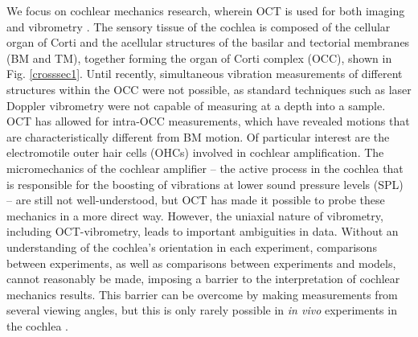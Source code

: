 \documentclass[preprint,NumberedRefs]{JASA}
\begin{document}
\par{We focus on cochlear mechanics research, wherein OCT is used for both imaging and vibrometry \citep{gao,dongoghalai,fallah,strimbu2020,fangyi,lee,cooper}. The sensory tissue of the cochlea is composed of the cellular organ of Corti and the acellular structures of the basilar and tectorial membranes (BM and TM), together forming the organ of Corti complex (OCC), shown in Fig. \ref{crosssec1}.  Until recently, simultaneous vibration measurements of different structures within the OCC were not possible, as standard techniques such as laser Doppler vibrometry were not capable of measuring at a depth into a sample. OCT has allowed for intra-OCC measurements, which have revealed motions that are characteristically different from BM motion. Of particular interest are the electromotile outer hair cells (OHCs) involved in cochlear amplification. The micromechanics of the cochlear amplifier -- the active process in the cochlea that is responsible for the boosting of vibrations at lower sound pressure levels (SPL) -- are still not well-understood, but OCT has made it possible to probe these mechanics in a more direct way. However, the uniaxial nature of vibrometry, including OCT-vibrometry, leads to important ambiguities in data. Without an understanding of the cochlea's orientation in each experiment, comparisons between experiments, as well as comparisons between experiments and models, cannot reasonably be made, imposing a barrier to the interpretation of cochlear mechanics results.  This barrier can be overcome by making measurements from several viewing angles, but this is only rarely possible in \textit{in vivo} experiments in the cochlea \citep{lee,cooper}.}
\end{document}
